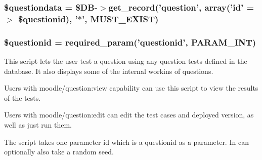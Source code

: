 \label{questiontestrun_8php_acf0d1ba8b3999333306bf1a4fd363e93}
\hypertarget{questiontestrun_8php_ab3dbd2b3f38fc871b3aba59ed0657c55}{
\subsubsection[{\$questiondata}]{\setlength{\rightskip}{0pt plus 5cm}\$questiondata = \$DB-\/$>$get\_\-record('question', array('id' =$>$ \$questionid), '$\ast$', MUST\_\-EXIST)}}
\label{questiontestrun_8php_ab3dbd2b3f38fc871b3aba59ed0657c55}
\hypertarget{questiontestrun_8php_a0b8a9e6194c5b1ca51e0f19a198c19d8}{
\subsubsection[{\$questionid}]{\setlength{\rightskip}{0pt plus 5cm}\$questionid = required\_\-param('questionid', PARAM\_\-INT)}}
\label{questiontestrun_8php_a0b8a9e6194c5b1ca51e0f19a198c19d8}
This script lets the user test a question using any question tests defined in the database. It also displays some of the internal workins of questions.

Users with moodle/question:view capability can use this script to view the results of the tests.

Users with moodle/question:edit can edit the test cases and deployed version, as well as just run them.

The script takes one parameter id which is a questionid as a parameter. In can optionally also take a random seed.

